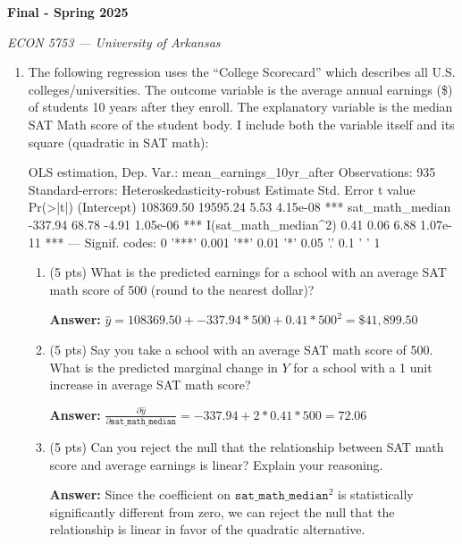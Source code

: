 \documentclass[12pt]{article}
\newcommand{\answer}[1]{{\color{blue_winged_teal}\textbf{Answer:} #1}}
\newcommand{\pts}[1]{{\color{zinc500}(#1 pts)}}
\begin{document}
\begin{center}
{\Huge\bf Final - Spring 2025}

\smallskip
{\large\it ECON 5753 — University of Arkansas}
\end{center}

\vspace{5mm}
\begin{enumerate}
  \item The following regression uses the ``College Scorecard'' which describes all U.S. colleges/universities. The outcome variable is the average annual earnings (\$) of students 10 years after they enroll. The explanatory variable is the median SAT Math score of the student body. I include both the variable itself and its square (quadratic in SAT math):
  \begin{codeblock}[{}]
OLS estimation, Dep. Var.: mean_earnings_10yr_after
Observations: 935
Standard-errors: Heteroskedasticity-robust
                       Estimate   Std. Error  t value   Pr(>|t|)
(Intercept)           108369.50     19595.24     5.53   4.15e-08 ***
sat_math_median         -337.94        68.78    -4.91   1.05e-06 ***
I(sat_math_median^2)       0.41         0.06     6.88   1.07e-11 ***
---
Signif. codes:  0 '***' 0.001 '**' 0.01 '*' 0.05 '.' 0.1 ' ' 1
  \end{codeblock}

  \begin{enumerate}[leftmargin = 2em]
    \item \pts{5} What is the predicted earnings for a school with an average SAT math score of 500 (round to the nearest dollar)?

    \answer{
      $\hat{y} = 108369.50 + -337.94 * 500 + 0.41 * 500^2 = \$41,899.50$
    }

    \item \pts{5} Say you take a school with an average SAT math score of 500. What is the predicted marginal change in $Y$ for a school with a 1 unit increase in average SAT math score?

    \answer{
      $\frac{\partial \hat{y}}{\partial \texttt{sat\_math\_median}} = -337.94 + 2 * 0.41 * 500 = 72.06$
    }

    \item \pts{5} Can you reject the null that the relationship between SAT math score and average earnings is linear? Explain your reasoning.

    \answer{
      Since the coefficient on $\texttt{sat\_math\_median}^2$ is statistically significantly different from zero, we can reject the null that the relationship is linear in favor of the quadratic alternative.
    }
  \end{enumerate}


\end{enumerate}
\end{document}
